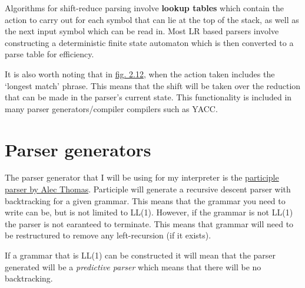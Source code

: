 Algorithms for shift-reduce parsing involve \textbf{lookup tables} which contain the action to carry out for each symbol that can lie at the top of the stack, as well as the next input symbol which can be read in. Most LR based parsers involve constructing a deterministic finite state automaton which is then converted to a parse table for efficiency.\textsuperscript{\cite{hopcroft_motwani_ullman_2006}}

It is also worth noting that in \hyperref[fig:2.12]{fig. 2.12}, when the action taken includes the `longest match' phrase. This means that the shift will be taken over the reduction that can be made in the parser's current state. This functionality is included in many parser generators/compiler compilers such as YACC.

\section{Parser generators}

The parser generator that I will be using for my interpreter is the \href{https://github.com/alecthomas/participle#overview}{participle parser by Alec Thomas}. Participle will generate a recursive descent parser with backtracking for a given grammar. This means that the grammar you need to write can be, but is not limited to LL(1). However, if the grammar is not LL(1) the parser is not earanteed to terminate. This means that grammar will need to be restructured to remove any left-recursion (if it exists).

If a grammar that is LL(1) can be constructed it will mean that the parser generated will be a \textit{predictive parser} which means that there will be no backtracking.
